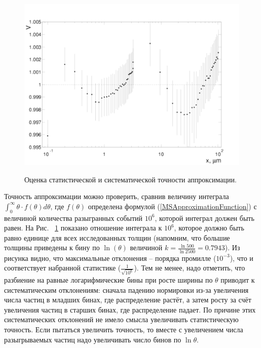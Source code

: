\documentclass[a4paper,12pt]{article}
\begin{document}
\begin{large}
  \begin{figure}[ht]
    {
       \includegraphics[width=0.99\linewidth]{images/check_norm_constant}
    }
    \caption{Оценка статистической и систематической точности аппроксимации.}
    \label{fig:Norma}
  \end{figure}
  
  Точность аппроксимации можно проверить, сравнив величину интеграла $\int_0^\infty\theta\cdot f(\theta)d\theta$, где $f(\theta)$ определена формулой (\ref{MSApproximationFunction}) с величиной количества разыгранных событий $10^6$, которой интеграл должен быть равен.
  На Рис. ~\ref{fig:Norma} показано отношение интеграла к $10^6$, которое должно быть равно единице для всех исследованных толщин (напомним, что большие толщины приведены к бину по $\ln(\theta)$ величиной $k=\frac{\ln{500}}{\ln{2500}}=0.7943$).
  Из рисунка видно, что максимальные отклонения -- порядка промилле ($10^{-3}$), что и соответствует набранной статистике ($\frac{1}{\sqrt{10^6}}$).
  Тем не менее, надо отметить, что разбиение на равные логарифмические бины при росте ширины по $\theta$ приводит к систематическим отклонениям: сначала падению нормировки из-за увеличения числа частиц в младших бинах, где распределение растёт, а затем росту за счёт увеличения частиц в старших бинах, где распределение падает.
  По причине этих систематических отклонений не имело смысла увеличивать статистическую точность.
  Если пытаться увеличить точность, то вместе с увеличением числа разыгрываемых частиц надо увеличивать число бинов по $\ln{\theta}$.
  

\end{large}
\end{document}

